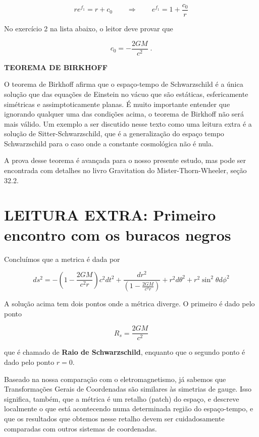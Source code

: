 \documentclass[11pt]{article}
\begin{document}
\[ \tag{4.10} r e^{f_1} = r + c_0 \qquad \Rightarrow \qquad  e^{f_1} = 1 + \frac{c_0}{r} \]

No exercício 2 na lista abaixo, o leitor deve provar que

\[ \tag{4.11} c_0 = - \frac{2 G M}{c^2}\; . \]

    \textbf{TEOREMA DE BIRKHOFF}

O teorema de Birkhoff afirma que o espaço-tempo de Schwarzschild é a
única solução que das equações de Einstein no vácuo que são estáticas,
esfericamente simétricas e assimptoticamente planas. É muito importante
entender que ignorando qualquer uma das condições acima, o teorema de
Birkhoff não será mais válido. Um exemplo a ser discutido nesse texto
como uma leitura extra é a solução de Sitter-Schwarzschild, que é a
generalização do espaço tempo Schwarzschild para o caso onde a constante
cosmológica não é nula.

A prova desse teorema é avançada para o nosso presente estudo, mas pode
ser encontrada com detalhes no livro Gravitation do
Mister-Thorn-Wheeler, seção 32.2.

    \hypertarget{leitura-extra-primeiro-encontro-com-os-buracos-negros}{%
\section{LEITURA EXTRA: Primeiro encontro com os buracos
negros}\label{leitura-extra-primeiro-encontro-com-os-buracos-negros}}

    Concluímos que a metrica é dada por

\[ \tag{5.1} ds^2 = -\left(1 - \frac{2 G M}{c^2 r}\right) c^2 dt^2 + \frac{dr^2}{\left(1 - \frac{2 G M}{c^2 r}\right)} + r^2 d\theta^2 + r^2 \sin^2\theta d\phi^2 \]

    A solução acima tem dois pontos onde a métrica diverge. O primeiro é
dado pelo ponto

\[ \tag{5.2} R_s = \frac{2GM}{c^2}\]

que é chamado de \textbf{Raio de Schwarzschild}, enquanto que o segundo
ponto é dado pelo ponto \(r=0\).

    Baseado na nossa comparação com o eletromagnetismo, já sabemos que
Transformações Gerais de Coordenadas são similares às simetrias de
gauge. Isso significa, também, que a métrica é um retalho (patch) do
espaço, e descreve localmente o que está acontecendo numa determinada
região do espaço-tempo, e que os resultados que obtemos nesse retalho
devem ser cuidadosamente comparadas com outros sistemas de coordenadas.
\end{document}
